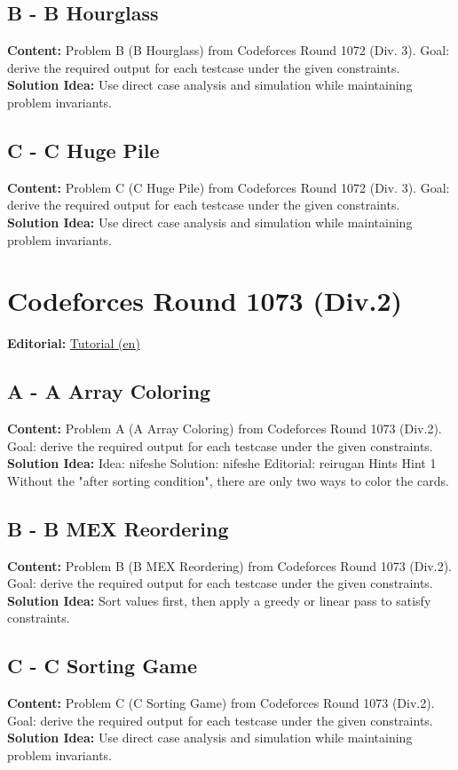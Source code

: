 \documentclass[11pt]{article}
\begin{document}
\subsection{B - B Hourglass}
\textbf{Content:} Problem B (B Hourglass) from Codeforces Round 1072 (Div. 3). Goal: derive the required output for each testcase under the given constraints.\\
\textbf{Solution Idea:} Use direct case analysis and simulation while maintaining problem invariants.

\subsection{C - C Huge Pile}
\textbf{Content:} Problem C (C Huge Pile) from Codeforces Round 1072 (Div. 3). Goal: derive the required output for each testcase under the given constraints.\\
\textbf{Solution Idea:} Use direct case analysis and simulation while maintaining problem invariants.

\section{Codeforces Round 1073 (Div.2)}
\textbf{Editorial:} \href{https://codeforces.com/blog/entry/150256}{Tutorial (en)}

\subsection{A - A Array Coloring}
\textbf{Content:} Problem A (A Array Coloring) from Codeforces Round 1073 (Div.2). Goal: derive the required output for each testcase under the given constraints.\\
\textbf{Solution Idea:} Idea: nifeshe Solution: nifeshe Editorial: reirugan Hints Hint 1 Without the "after sorting condition", there are only two ways to color the cards.

\subsection{B - B MEX Reordering}
\textbf{Content:} Problem B (B MEX Reordering) from Codeforces Round 1073 (Div.2). Goal: derive the required output for each testcase under the given constraints.\\
\textbf{Solution Idea:} Sort values first, then apply a greedy or linear pass to satisfy constraints.

\subsection{C - C Sorting Game}
\textbf{Content:} Problem C (C Sorting Game) from Codeforces Round 1073 (Div.2). Goal: derive the required output for each testcase under the given constraints.\\
\textbf{Solution Idea:} Use direct case analysis and simulation while maintaining problem invariants.
\end{document}
